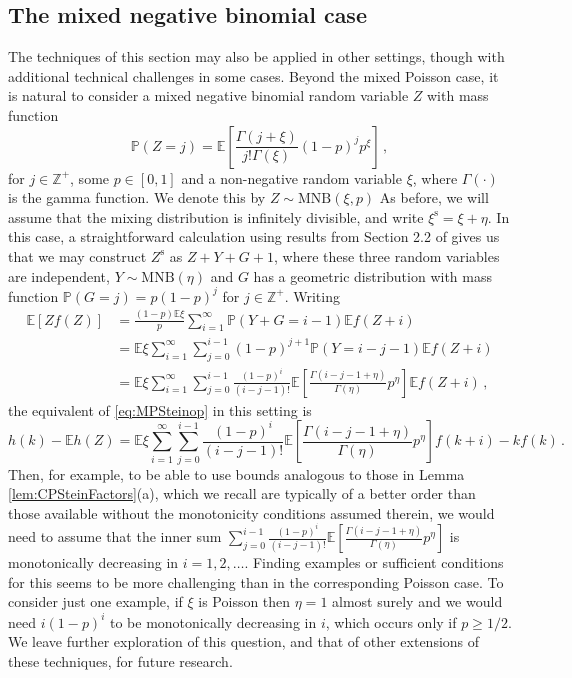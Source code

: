 \documentclass[12pt]{article}
\begin{document}
\subsection{The mixed negative binomial case}\label{subsec:negbin}

The techniques of this section may also be applied in other settings, though with additional technical challenges in some cases. Beyond the mixed Poisson case, it is natural to consider a mixed negative binomial random variable $Z$ with mass function
\[
\mathbb{P}(Z=j)=\mathbb{E}\left[\frac{\Gamma(j+\xi)}{j!\Gamma(\xi)}(1-p)^jp^\xi\right]\,,
\]
for $j\in\mathbb{Z}^+$, some $p\in[0,1]$ and a non-negative random variable $\xi$, where $\Gamma(\cdot)$ is the gamma function. We denote this by $Z\sim\text{MNB}(\xi,p)$ As before, we will assume that the mixing distribution is infinitely divisible, and write $\xi^\text{s}=\xi+\eta$. In this case, a straightforward calculation using results from Section 2.2 of \cite{arratia19} gives us that we may construct $Z^\text{s}$ as $Z+Y+G+1$, where these three random variables are independent, $Y\sim\text{MNB}(\eta)$ and $G$ has a geometric distribution with mass function $\mathbb{P}(G=j)=p(1-p)^j$ for $j\in\mathbb{Z}^+$. Writing
\begin{align*}
\mathbb{E}[Zf(Z)]&=\frac{(1-p)\mathbb{E}\xi}{p}\sum_{i=1}^\infty\mathbb{P}(Y+G=i-1)\mathbb{E}f(Z+i)\\
&=\mathbb{E}\xi\sum_{i=1}^\infty\sum_{j=0}^{i-1}(1-p)^{j+1}\mathbb{P}(Y=i-j-1)\mathbb{E}f(Z+i)\\
&=\mathbb{E}\xi\sum_{i=1}^\infty\sum_{j=0}^{i-1}\frac{(1-p)^{i}}{(i-j-1)!}\mathbb{E}\left[\frac{\Gamma(i-j-1+\eta)}{\Gamma(\eta)}p^\eta\right]\mathbb{E}f(Z+i)\,,
\end{align*}
the equivalent of \eqref{eq:MPSteinop} in this setting is
\[
h(k)-\mathbb{E}h(Z)=\mathbb{E}\xi\sum_{i=1}^\infty\sum_{j=0}^{i-1}\frac{(1-p)^{i}}{(i-j-1)!}\mathbb{E}\left[\frac{\Gamma(i-j-1+\eta)}{\Gamma(\eta)}p^\eta\right]f(k+i)-kf(k)\,.
\]
Then, for example, to be able to use bounds analogous to those in Lemma \ref{lem:CPSteinFactors}(a), which we recall are typically of a better order than those available without the monotonicity conditions assumed therein, we would need to assume that the inner sum $\sum_{j=0}^{i-1}\frac{(1-p)^{i}}{(i-j-1)!}\mathbb{E}\left[\frac{\Gamma(i-j-1+\eta)}{\Gamma(\eta)}p^\eta\right]$ is monotonically decreasing in $i=1,2,\ldots$. Finding examples or sufficient conditions for this seems to be more challenging than in the corresponding Poisson case. To consider just one example, if $\xi$ is Poisson then $\eta=1$ almost surely and we would need $i(1-p)^i$ to be monotonically decreasing in $i$, which occurs only if $p\geq1/2$. We leave further exploration of this question, and that of other extensions of these techniques, for future research.
\end{document}
